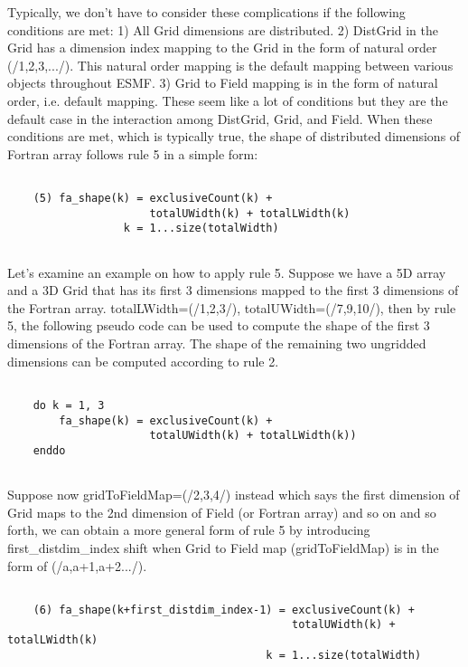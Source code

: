     Typically, we don't have to consider these complications if the following
    conditions are met: 1) All Grid dimensions are distributed. 2) DistGrid
    in the Grid has a dimension index mapping to the Grid in the form of 
    natural order (/1,2,3,.../). This natural order mapping is the
    default mapping between various objects throughout ESMF. 3) Grid to Field
    mapping is in the form of natural order, i.e. default mapping. These
    seem like a lot of conditions but they are the default case in the interaction
    among DistGrid, Grid, and Field. When these conditions are met, which
    is typically true, the shape of distributed dimensions of Fortran array
    follows rule 5 in a simple form:
  
    \begin{verbatim}
  
    (5) fa_shape(k) = exclusiveCount(k) + 
                      totalUWidth(k) + totalLWidth(k) 
                  k = 1...size(totalWidth)
  
    \end{verbatim}
  
    Let's examine an example on how to apply rule 5. Suppose we have a
    5D array and a 3D Grid that has its first 3 dimensions mapped to the first
    3 dimensions of the Fortran array. totalLWidth=(/1,2,3/), 
    totalUWidth=(/7,9,10/), then by rule 5, the following pseudo code
    can be used to compute the shape of the first 3 dimensions of the Fortran
    array. The shape of the remaining two ungridded dimensions can be
    computed according to rule 2.
  
    \begin{verbatim}
  
    do k = 1, 3
        fa_shape(k) = exclusiveCount(k) + 
                      totalUWidth(k) + totalLWidth(k)) 
    enddo
  
    \end{verbatim}
  
    Suppose now gridToFieldMap=(/2,3,4/) instead which says
    the first dimension of Grid maps to the 2nd dimension of Field (or 
    Fortran array) and so on and so forth, we can obtain a more general form 
    of rule 5 by introducing first\_distdim\_index shift when Grid to Field
    map (gridToFieldMap) is in the form of (/a,a+1,a+2.../).
  
    \begin{verbatim}
  
    (6) fa_shape(k+first_distdim_index-1) = exclusiveCount(k) +
                                            totalUWidth(k) + totalLWidth(k)
                                        k = 1...size(totalWidth)
  
    \end{verbatim}
  
